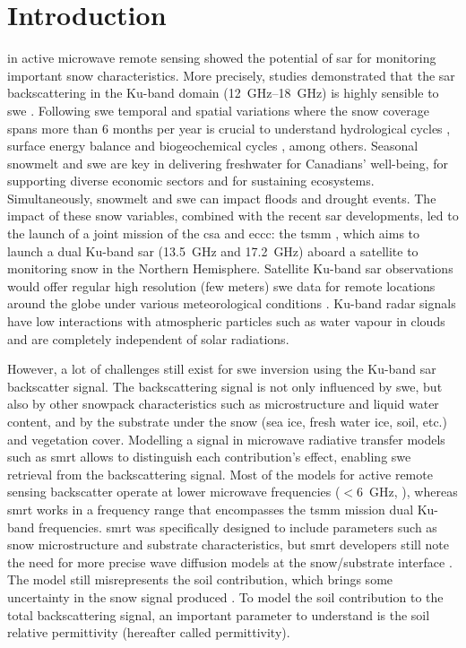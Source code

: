 \section{Introduction}

 in active microwave remote sensing showed the potential of \ac{sar} for monitoring important snow characteristics.
More precisely, studies demonstrated that the \ac{sar} backscattering in the Ku-band domain (\qtyrange{12}{18}{\giga\hertz}) is highly sensible to \acf{swe} \parencite{Shi2016,King2018,Rutter2019}.
Following \ac{swe} temporal and spatial variations where the snow coverage spans more than 6 months per year is crucial to understand hydrological cycles \parencite{Zhang2005,Ayguen2020}, surface energy balance \parencite{Cohen2001,Box2019} and biogeochemical cycles \parencite{Zhang2005,Grogan2006}, among others.
Seasonal snowmelt and \ac{swe} are key in delivering freshwater for Canadians' well-being, for supporting diverse economic sectors and for sustaining ecosystems.
Simultaneously, snowmelt and \ac{swe} can impact floods and drought events.
The impact of these snow variables, combined with the recent \ac{sar} developments, led to the launch of a joint mission of the \ac{csa} and \ac{eccc}: the \acf{tsmm} \parencite{Derksen2019,Garnaud2019}, which aims to launch a dual Ku-band \ac{sar} (\qty{13.5}{\giga\hertz} and \qty{17.2}{\giga\hertz}) aboard a satellite to monitoring snow in the Northern Hemisphere.
Satellite Ku-band \ac{sar} observations would offer regular high resolution (few meters) \ac{swe} data for remote locations around the globe under various meteorological conditions \parencite{Tsai2019}.
Ku-band radar signals have low interactions with atmospheric particles such as water vapour in clouds and are completely independent of solar radiations.

However, a lot of challenges still exist for \ac{swe} inversion using the Ku-band \ac{sar} backscatter signal.
The backscattering signal is not only influenced by \ac{swe}, but also by other snowpack characteristics such as microstructure and liquid water content, and by the substrate under the snow (sea ice, fresh water ice, soil, etc.) and vegetation cover.
Modelling a signal in microwave radiative transfer models such as \ac{smrt} \parencite{Picard2018} allows to distinguish each contribution's effect, enabling \ac{swe} retrieval from the backscattering signal.
Most of the models for active remote sensing backscatter operate at lower microwave frequencies (\(<\)\qty{6}{\giga\hertz}, \parencite{Longepe2009}), whereas \ac{smrt} works in a frequency range that encompasses the \ac{tsmm} mission dual Ku-band frequencies.
\ac{smrt} was specifically designed to include parameters such as snow microstructure and substrate characteristics, but \ac{smrt} developers still note the need for more precise wave diffusion models at the snow/substrate interface \parencite{Picard2018}.
The model still misrepresents the soil contribution, which brings some uncertainty in the snow signal produced \parencite{King2018}.
To model the soil contribution to the total backscattering signal, an important parameter to understand is the soil relative permittivity (hereafter called permittivity).

